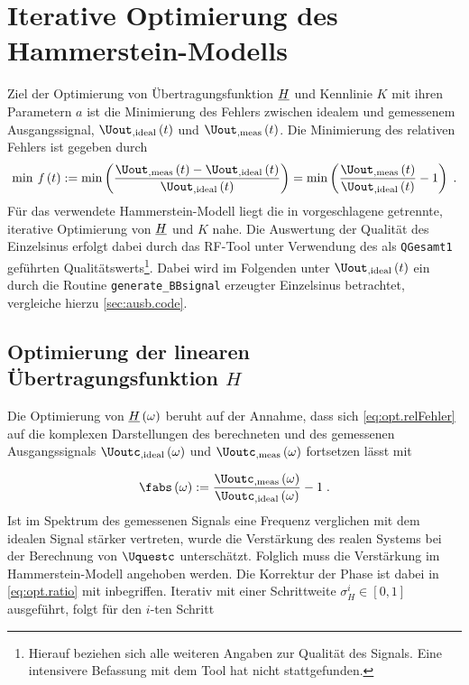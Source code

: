 \documentclass[../Report.tex]{subfiles}
\begin{document}
\chapter{Iterative Optimierung des Hammerstein-Modells}
\label{chap:opt}

Ziel der Optimierung von Übertragungsfunktion $\underline{H}$ und Kennlinie $K$ mit ihren Parametern $a$ ist die Minimierung des Fehlers zwischen idealem und gemessenem Ausgangssignal, $\Uout_{, \mathrm{ideal}} \oft$ und $\Uout_{, \mathrm{meas}} \oft$. Die Minimierung des relativen Fehlers ist gegeben durch
\begin{align}
\label{eq:opt.relFehler}
	\min \; \mathit{f} \oft := \min \left( \frac{\Uout_{, \mathrm{meas}} \oft  - \Uout_{, \mathrm{ideal}} \oft}{ \Uout_{, \mathrm{ideal}} \oft} \right) 
	= \min \left( \frac{ \Uout_{, \mathrm{meas}}\oft}{ \Uout_{, \mathrm{ideal}}\oft} -1 \right) 
	\; .
\end{align}
Für das verwendete Hammerstein-Modell liegt die in \cite{harzheim18}
vorgeschlagene getrennte, iterative Optimierung von $\underline{H}$ und $K$ nahe. 
Die Auswertung der Qualität des Einzelsinus erfolgt dabei durch das RF-Tool \cite{RF-Tool} unter Verwendung des als \lstinline{QGesamt1} geführten Qualitätswerts\footnote{\label{foot:opt.H.quality} Hierauf beziehen sich alle weiteren Angaben zur Qualität des Signals. Eine intensivere Befassung mit dem Tool hat nicht stattgefunden.}.
Dabei wird im Folgenden unter $\Uout_{, \mathrm{ideal}} \oft$ ein durch die Routine \lstinline{generate_BBsignal} erzeugter Einzelsinus betrachtet, vergleiche hierzu \ref{sec:ausb.code}. 

\section{Optimierung der linearen Übertragungsfunktion $H$}
\label{sec:opt.H}

Die Optimierung von $\underline{H} \left( \omega \right)$ beruht auf der Annahme, dass sich \eqref{eq:opt.relFehler} auf die komplexen Darstellungen des berechneten und des gemessenen Ausgangssignals $\Uoutc_{, \mathrm{ideal}} \ofomega $ und $\Uoutc_{, \mathrm{meas}} \ofomega $ fortsetzen lässt mit 

\begin{align}
\label{eq:opt.ratio}
	\fabs \ofomega :=  
				\frac{ \Uoutc_{, \mathrm{meas}} \ofomega }{\Uoutc_{, \mathrm{ideal}} \ofomega } -1
				\; .
\end{align}
Ist im Spektrum des gemessenen Signals eine Frequenz verglichen mit dem idealen Signal stärker vertreten, wurde die Verstärkung des realen Systems bei der Berechnung von $\Uquestc$ unterschätzt. Folglich muss die Verstärkung im Hammerstein-Modell angehoben werden. Die Korrektur der Phase ist dabei in \eqref{eq:opt.ratio} mit inbegriffen.
Iterativ mit einer Schrittweite $\sigma_H^i \in \left[ 0 , 1 \right]$ ausgeführt, folgt für den $i$-ten Schritt
\end{document}
